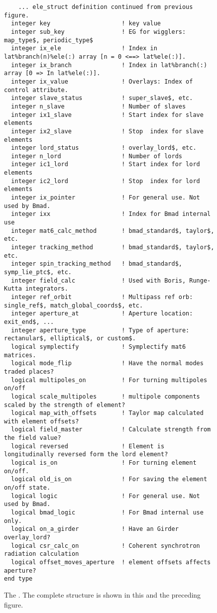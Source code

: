 \begin{figure}[tb]
\centering
\footnotesize
\begin{verbatim}
    ... ele_struct definition continued from previous figure.
  integer key                    ! key value
  integer sub_key                ! EG for wigglers: map_type$, periodic_type$
  integer ix_ele                 ! Index in lat%branch(n)%ele(:) array [n = 0 <==> lat%ele(:)].
  integer ix_branch              ! Index in lat%branch(:) array [0 => In lat%ele(:)].
  integer ix_value               ! Overlays: Index of control attribute. 
  integer slave_status           ! super_slave$, etc.
  integer n_slave                ! Number of slaves
  integer ix1_slave              ! Start index for slave elements
  integer ix2_slave              ! Stop  index for slave elements
  integer lord_status            ! overlay_lord$, etc.
  integer n_lord                 ! Number of lords
  integer ic1_lord               ! Start index for lord elements
  integer ic2_lord               ! Stop  index for lord elements
  integer ix_pointer             ! For general use. Not used by Bmad.
  integer ixx                    ! Index for Bmad internal use
  integer mat6_calc_method       ! bmad_standard$, taylor$, etc.
  integer tracking_method        ! bmad_standard$, taylor$, etc.
  integer spin_tracking_method   ! bmad_standard$, symp_lie_ptc$, etc.
  integer field_calc             ! Used with Boris, Runge-Kutta integrators.
  integer ref_orbit              ! Multipass ref orb: single_ref$, match_global_coords$, etc.
  integer aperture_at            ! Aperture location: exit_end$, ...
  integer aperture_type          ! Type of aperture: rectanular$, elliptical$, or custom$. 
  logical symplectify            ! Symplectify mat6 matrices.
  logical mode_flip              ! Have the normal modes traded places?
  logical multipoles_on          ! For turning multipoles on/off
  logical scale_multipoles       ! multipole components scaled by the strength of element?
  logical map_with_offsets       ! Taylor map calculated with element offsets?
  logical field_master           ! Calculate strength from the field value?
  logical reversed               ! Element is longitudinally reversed form the lord element?
  logical is_on                  ! For turning element on/off.
  logical old_is_on              ! For saving the element on/off state.
  logical logic                  ! For general use. Not used by Bmad.
  logical bmad_logic             ! For Bmad internal use only.
  logical on_a_girder            ! Have an Girder overlay_lord?
  logical csr_calc_on            ! Coherent synchrotron radiation calculation
  logical offset_moves_aperture  ! element offsets affects aperture?          
end type
\end{verbatim}
\caption[The  (part 2).]{The . 
The complete structure is shown in this and the preceding figure.}
\label{f:ele.struct2}
\end{figure}

